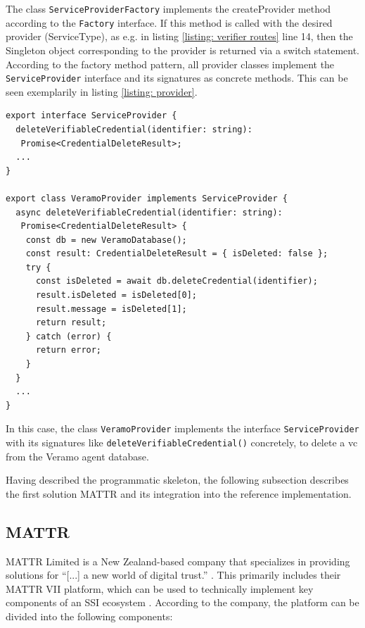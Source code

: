     The class \texttt{ServiceProviderFactory} implements the createProvider method according to the \texttt{Factory} interface. If this method is called with the desired provider (ServiceType), as e.g. in listing \ref{listing: verifier routes} line 14, then the Singleton object corresponding to the provider is returned via a switch statement. According to the factory method pattern, all provider classes implement the \texttt{ServiceProvider} interface and its signatures as concrete methods. This can be seen exemplarily in listing \ref{listing: provider}.
    \newline
\begin{lstlisting}[style=ES6, caption=Example of provider implementation, label={listing: provider}]
export interface ServiceProvider {
  deleteVerifiableCredential(identifier: string): 
   Promise<CredentialDeleteResult>;
  ...
}

export class VeramoProvider implements ServiceProvider {
  async deleteVerifiableCredential(identifier: string): 
   Promise<CredentialDeleteResult> {
    const db = new VeramoDatabase();
    const result: CredentialDeleteResult = { isDeleted: false };
    try {
      const isDeleted = await db.deleteCredential(identifier);
      result.isDeleted = isDeleted[0];
      result.message = isDeleted[1];
      return result;
    } catch (error) {
      return error;
    }
  }
  ...
}\end{lstlisting}

    In this case, the class \texttt{VeramoProvider} implements the interface \texttt{ServiceProvider} with its signatures like \texttt{deleteVerifiableCredential()} concretely, to delete a \ac{vc} from the Veramo agent database.
    
    Having described the programmatic skeleton, the following subsection describes the first solution MATTR and its integration into the reference implementation.
    
    \subsection{MATTR}\label{subsection: mattr}
    MATTR Limited is a New Zealand-based company \cite{mattr_privacy_2021} that specializes in providing solutions for “[...] a new world of digital trust.” \cite{mattr_mattr_2021-1}. This primarily includes their MATTR VII platform, which can be used to technically implement key components of an \ac{SSI} ecosystem \cite{mattr_products_2021}. According to the company, the platform can be divided into the following components: \cite{mattr_mattr_2021}

